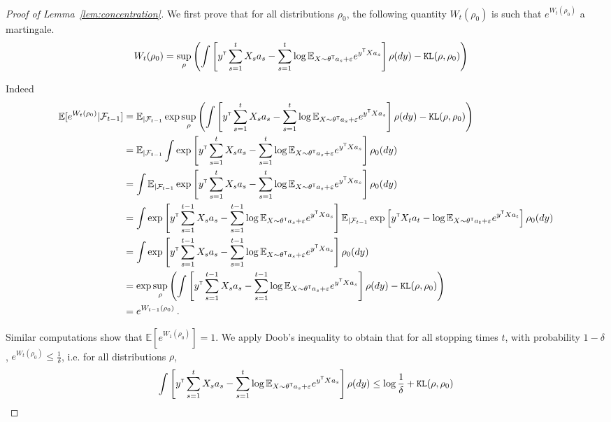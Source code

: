\begin{proof}[Proof of Lemma~\ref{lem:concentration}]
We first prove that for all distributions $\rho_0$, the following quantity $W_t(\rho_0)$ is such that $e^{W_t(\rho_0)}$ a martingale.
\begin{align*}
W_t(\rho_0) &= \sup_\rho \left( \int \left[y^{\mathsf{\scriptscriptstyle T}} \sum_{s=1}^t X_s a_s - \sum_{s=1}^t \log \mathbb{E}_{X\sim \theta^{\mathsf{\scriptscriptstyle T}} a_s+\varepsilon}e^{y^{\mathsf{\scriptscriptstyle T}} X a_s} \right] \rho(dy) - \texttt{KL}(\rho,\rho_0) \right)
\end{align*}

Indeed
\begin{align*}
\mathbb{E}[ e^{W_t(\rho_0)}| \mathcal F_{t-1}]
&= \mathbb{E}_{|\mathcal F_{t-1}}\exp \sup_\rho \left( \int \left[y^{\mathsf{\scriptscriptstyle T}} \sum_{s=1}^t X_s a_s - \sum_{s=1}^t \log \mathbb{E}_{X\sim \theta^{\mathsf{\scriptscriptstyle T}} a_s+\varepsilon}e^{y^{\mathsf{\scriptscriptstyle T}} X a_s} \right]  \rho(dy) - \texttt{KL}(\rho,\rho_0) \right)
\\
&= \mathbb{E}_{|\mathcal F_{t-1}} \int \exp \left[y^{\mathsf{\scriptscriptstyle T}} \sum_{s=1}^t X_s a_s - \sum_{s=1}^t \log \mathbb{E}_{X\sim \theta^{\mathsf{\scriptscriptstyle T}} a_s+\varepsilon}e^{y^{\mathsf{\scriptscriptstyle T}} X a_s} \right] \rho_0(dy)
\\
&=  \int \mathbb{E}_{|\mathcal F_{t-1}} \exp \left[y^{\mathsf{\scriptscriptstyle T}} \sum_{s=1}^t X_s a_s - \sum_{s=1}^t \log \mathbb{E}_{X\sim \theta^{\mathsf{\scriptscriptstyle T}} a_s+\varepsilon}e^{y^{\mathsf{\scriptscriptstyle T}} X a_s} \right] \rho_0(dy)
\\
&=  \int \exp \left[y^{\mathsf{\scriptscriptstyle T}} \sum_{s=1}^{t-1} X_s a_s - \sum_{s=1}^{t-1} \log \mathbb{E}_{X\sim \theta^{\mathsf{\scriptscriptstyle T}} a_s+\varepsilon}e^{y^{\mathsf{\scriptscriptstyle T}} X a_s} \right]\mathbb{E}_{|\mathcal F_{t-1}} \exp \left[y^{\mathsf{\scriptscriptstyle T}}  X_t a_t - \log \mathbb{E}_{X\sim \theta^{\mathsf{\scriptscriptstyle T}} a_t+\varepsilon}e^{y^{\mathsf{\scriptscriptstyle T}} X a_t} \right] \rho_0(dy)
\\
&=  \int \exp \left[y^{\mathsf{\scriptscriptstyle T}} \sum_{s=1}^{t-1} X_s a_s - \sum_{s=1}^{t-1} \log \mathbb{E}_{X\sim \theta^{\mathsf{\scriptscriptstyle T}} a_s+\varepsilon}e^{y^{\mathsf{\scriptscriptstyle T}} X a_s} \right] \rho_0(dy)
\\
&=   \exp \sup_\rho \left(\int\left[y^{\mathsf{\scriptscriptstyle T}} \sum_{s=1}^{t-1} X_s a_s - \sum_{s=1}^{t-1} \log \mathbb{E}_{X\sim \theta^{\mathsf{\scriptscriptstyle T}} a_s+\varepsilon}e^{y^{\mathsf{\scriptscriptstyle T}} X a_s} \right] \rho(dy) - \texttt{KL}(\rho, \rho_0) \right)
\\
&= e^{W_{t-1}(\rho_0)} \: .
\end{align*}

Similar computations show that $\mathbb{E}[e^{W_1(\rho_0)}] = 1$. We apply Doob's inequality to obtain that for all stopping times $t$, with probability $1- \delta$, $e^{W_{t}(\rho_0)} \le \frac{1}{\delta}$, i.e. for all distributions $\rho$,
\begin{align*}
\int \left[y^{\mathsf{\scriptscriptstyle T}} \sum_{s=1}^t X_s a_s - \sum_{s=1}^t \log \mathbb{E}_{X\sim \theta^{\mathsf{\scriptscriptstyle T}} a_s+\varepsilon}e^{y^{\mathsf{\scriptscriptstyle T}} X a_s} \right] \rho(dy)
\le \log\frac{1}{\delta} + \texttt{KL}(\rho,\rho_0)
\end{align*}


\end{proof}
